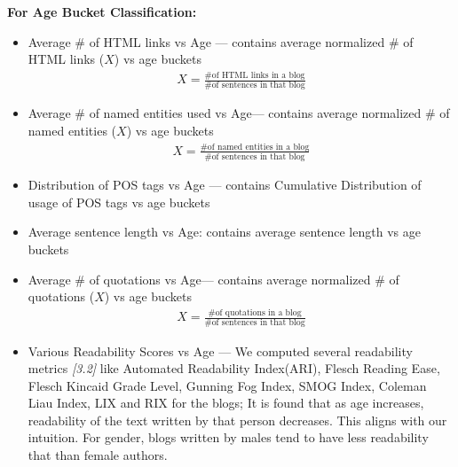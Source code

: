 \documentclass{sig-alternate}
\begin{document}

\begin{figure*}
%
\hspace*{\fill}
%
\end{figure*}


\textbf{For Age Bucket Classification:}
\begin{itemize}
\item Average \# of HTML links vs Age --- contains average normalized \# of HTML links ($X$) vs age buckets
\begin{align}
X = \frac{\# \textrm{of HTML links in a blog}}{\#\textrm{of sentences in that blog}}
\end{align}
\item Average \# of named entities used vs Age--- contains average normalized \# of named entities ($X$) vs age buckets
\begin{align}
X = \frac{\# \textrm{of named entities in a blog}}{\#\textrm{of sentences in that blog}}
\end{align}
\item Distribution of POS tags vs Age --- contains Cumulative Distribution of usage of POS tags vs age buckets
\item Average sentence length vs Age: contains average sentence length vs age buckets 
\item Average \# of quotations vs Age--- contains average normalized \# of quotations ($X$) vs age buckets
\begin{align}
X = \frac{\# \textrm{of quotations in a blog}}{\#\textrm{of sentences in that blog}}
\end{align}
\item Various Readability Scores vs Age --- We computed several readability metrics \textit{[3.2]} like Automated Readability Index(ARI), Flesch Reading Ease, Flesch Kincaid Grade Level, Gunning Fog Index, SMOG Index, Coleman Liau Index, LIX and RIX for the blogs; It is found that as age increases, readability of the text written by that person decreases. This aligns with our intuition. For gender, blogs written by males tend to have less readability that than female authors. 
\end{itemize}
\end{document}
